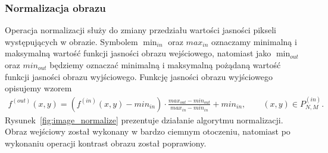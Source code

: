 \subsubsection{Normalizacja obrazu}
Operacja normalizacji służy do zmiany przedziału wartości jasności pikseli występujących w obrazie. Symbolem $\min_{in}$ oraz $max_{in}$ oznaczamy minimalną i maksymalną wartość funkcji jasności obrazu wejściowego, natomiast jako $\min_{out}$ oraz $min_{out}$ będziemy oznaczać minimalną i maksymalną pożądaną wartość funkcji jasności obrazu wyjściowego. Funkcję jasności obrazu wyjściowego opisujemy wzorem
\begin{gather*}
  f^{(out)}(x, y) = (f^{(in)}(x, y) - min_{in}) \cdot \frac{max_{out} - min_{out}}{max_{in} - min_{in}}+min_{in}, \quad \quad (x, y) \in P^{(in)}_{N,M}.
\end{gather*}
Rysunek~\ref{fig:image_normalize} prezentuje działanie algorytmu normalizacji. Obraz wejściowy został wykonany w bardzo ciemnym otoczeniu, natomiast po wykonaniu operacji kontrast obrazu został poprawiony.
